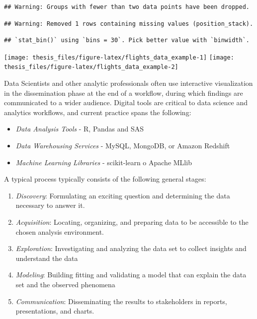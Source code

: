 \documentclass[print]{nuthesis}
\providecommand{\tightlist}{%
  \setlength{\itemsep}{0pt}\setlength{\parskip}{0pt}}
\begin{document}
\begin{verbatim}
## Warning: Groups with fewer than two data points have been dropped.
\end{verbatim}

\begin{verbatim}
## Warning: Removed 1 rows containing missing values (position_stack).
\end{verbatim}

\begin{verbatim}
## `stat_bin()` using `bins = 30`. Pick better value with `binwidth`.
\end{verbatim}

\begin{center}\texttt{[image: thesis\_files/figure-latex/flights\_data\_example-1]} \texttt{[image: thesis\_files/figure-latex/flights\_data\_example-2]} \end{center}

Data Scientists and other analytic professionals often use interactive visualization in the dissemination phase at the end of a workflow, during which findings are communicated to a wider audience. Digital tools are critical to data science and analytics workflows, and current practice spans the following:

\begin{itemize}
\tightlist
\item
  \emph{Data Analysis Tools} - R, Pandas and SAS
\item
  \emph{Data Warehousing Services} - MySQL, MongoDB, or Amazon Redshift
\item
  \emph{Machine Learning Libraries} - scikit-learn o Apache MLlib
\end{itemize}

A typical process typically consists of the following general stages:

\begin{enumerate}
\def\labelenumi{\arabic{enumi}.}
\tightlist
\item
  \emph{Discovery}: Formulating an exciting question and determining the data necessary to answer it.
\item
  \emph{Acquisition}: Locating, organizing, and preparing data to be accessible to the chosen analysis environment.
\item
  \emph{Exploration}: Investigating and analyzing the data set to collect insights and understand the data
\item
  \emph{Modeling}: Building fitting and validating a model that can explain the data set and the observed phenomena
\item
  \emph{Communication}: Disseminating the results to stakeholders in reports, presentations, and charts.
\end{enumerate}
\end{document}
